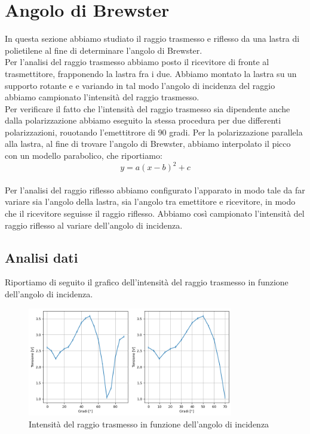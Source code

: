 \documentclass[letterpaper,12pt]{article}
\begin{document}
\section{Angolo di Brewster}
In questa sezione abbiamo studiato il raggio trasmesso e riflesso da una lastra di polietilene al fine di determinare
l'angolo di Brewster.\\
Per l'analisi del raggio trasmesso abbiamo posto il ricevitore di fronte al trasmettitore, frapponendo la lastra 
fra i due. Abbiamo montato la lastra su un supporto rotante e e variando in tal modo l'angolo di incidenza del raggio
abbiamo campionato l'intensità del raggio trasmesso.\\
Per verificare il fatto che l'intensità del raggio trasmesso sia dipendente anche dalla polarizzazione abbiamo 
eseguito la stessa procedura per due differenti polarizzazioni, rouotando l'emettitrore di 90 gradi. Per la polarizzazione
parallela alla lastra, al fine di trovare l'angolo di Brewster, abbiamo interpolato il picco con un modello parabolico,
che riportiamo:
\begin{equation}
    y = a(x-b)^2 + c
    \label{eq:parabola}
\end{equation}
\\

Per l'analisi del raggio riflesso abbiamo configurato l'apparato in modo tale da far variare sia l'angolo della lastra,
sia l'angolo tra emettitore e ricevitore, in modo che il ricevitore seguisse il raggio riflesso. Abbiamo così campionato
l'intensità del raggio riflesso al variare dell'angolo di incidenza.\\

\subsection{Analisi dati} 

Riportiamo di seguito il grafico dell'intensità del raggio trasmesso in funzione dell'angolo di incidenza.\\
\begin{figure}[h!]
    \centering
    \includegraphics[width = 0.8\textwidth]{trasmesso.png}
    \caption{Intensità del raggio trasmesso in funzione dell'angolo di incidenza}
    \label{fig:trasmesso}
\end{figure}
\end{document}
